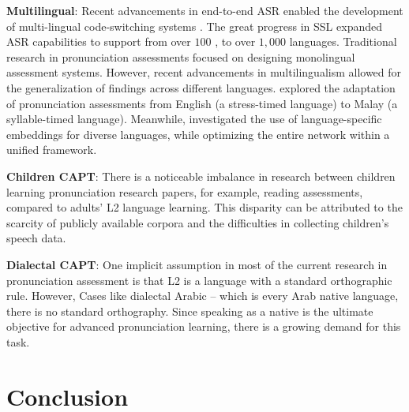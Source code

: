 \documentclass[11pt]{article}
\begin{document}
\textbf{Multilingual}: Recent advancements in end-to-end ASR enabled the development of multi-lingual code-switching systems \cite{datta2020language, chowdhury2021onemodel, ogunremi2023multilingual}. The great progress in SSL expanded ASR capabilities to support from over $100$ \cite{pratap2023scaling}, to over $1,000$ \cite{pratap2023scaling} languages. Traditional research in pronunciation assessments focused on designing monolingual assessment systems. However, recent advancements in multilingualism allowed for the generalization of findings across different languages. \citet{ zhang2021multilingual} explored the adaptation of pronunciation assessments from English (a stress-timed language) to Malay (a syllable-timed language). Meanwhile, \citet{ lin2023multi} investigated the use of language-specific embeddings for diverse languages, while optimizing the entire network within a unified framework.

\textbf{Children CAPT}: There is a noticeable imbalance in research between children learning pronunciation research papers, for example, reading assessments, compared to adults' L2 language learning. This disparity can be attributed to the scarcity of publicly available corpora and the difficulties in collecting children’s speech data. %

\textbf{Dialectal CAPT}: One implicit assumption in most of the current research in pronunciation assessment is that L2 is a language with a standard orthographic rule. However, Cases like dialectal Arabic -- which is every Arab native language, there is no standard orthography. Since speaking as a native is the ultimate objective for advanced pronunciation learning, there is a growing demand for this task.


\section{Conclusion}
\label{sec:conclusion}
\end{document}

